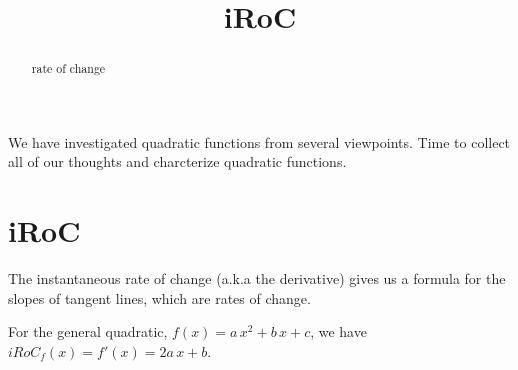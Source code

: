 \documentclass{ximera}
\title{iRoC}
\begin{document}
\begin{abstract}
rate of change
\end{abstract}
\maketitle




We have investigated quadratic functions from several viewpoints.  Time to collect all of our thoughts and charcterize quadratic functions.















\section{iRoC}


The instantaneous rate of change (a.k.a the derivative) gives us a formula for the slopes of tangent lines, which are rates of change.



For the general quadratic, $f(x) = a \, x^2 + b \, x + c$, we have $iRoC_f(x) = f'(x) = 2a \, x + b$. \\
\end{document}
